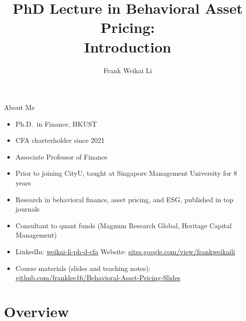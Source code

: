 \documentclass[aspectratio=169, 11pt]{beamer}
\title[EF8083 Lecture 1]{PhD Lecture in Behavioral Asset Pricing:\\ Introduction}
\author[F.\ W.\ Li]{Frank Weikai Li}
\institute[CityU]{Associate Professor of Finance\\City University of Hong Kong}
\date{}
\begin{document}

\begin{frame}[plain]
\titlepage
\end{frame}

\begin{frame}{About Me}
\begin{itemize}
  \item Ph.D.\ in Finance, HKUST
  \item CFA charterholder since 2021
  \item Associate Professor of Finance
  \item Prior to joining CityU, taught at Singapore Management University for 8 years
  \item Research in behavioral finance, asset pricing, and ESG, published in top journals
  \item Consultant to quant funds (Magnum Research Global, Heritage Capital Management)
  \item LinkedIn: \href{https://www.linkedin.com/in/weikai-li-ph-d-cfa-9aa65231/}{weikai-li-ph-d-cfa}
  \quad Website: \href{https://sites.google.com/view/frankweikaili/home}{sites.google.com/view/frankweikaili}
  \item Course materials (slides and teaching notes): \href{https://github.com/franklee16/Behavioral-Asset-Pricing-Slides/tree/main}{github.com/franklee16/Behavioral-Asset-Pricing-Slides}
\end{itemize}
\end{frame}

\section{Overview}
\end{document}
